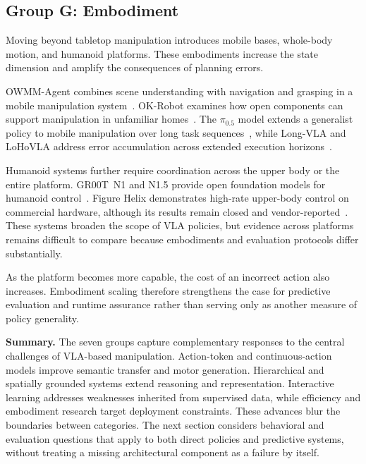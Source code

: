 \documentclass{ieeeaccess}
\begin{document}
\subsection{Group G: Embodiment}
\label{sec:groupG}

Moving beyond tabletop manipulation introduces mobile bases, whole-body motion, and humanoid platforms. These embodiments increase the state dimension and amplify the consequences of planning errors.

OWMM-Agent combines scene understanding with navigation and grasping in a mobile manipulation system~\cite{owmmagent}. OK-Robot examines how open components can support manipulation in unfamiliar homes~\cite{okrobot}. The $\pi_{0.5}$ model extends a generalist policy to mobile manipulation over long task sequences~\cite{pi05}, while Long-VLA and LoHoVLA address error accumulation across extended execution horizons~\cite{longvla,lohovla}.

Humanoid systems further require coordination across the upper body or the entire platform. GR00T~N1 and N1.5 provide open foundation models for humanoid control~\cite{groot,grootn15}. Figure Helix demonstrates high-rate upper-body control on commercial hardware, although its results remain closed and vendor-reported~\cite{helix}. These systems broaden the scope of VLA policies, but evidence across platforms remains difficult to compare because embodiments and evaluation protocols differ substantially.

As the platform becomes more capable, the cost of an incorrect action also increases. Embodiment scaling therefore strengthens the case for predictive evaluation and runtime assurance rather than serving only as another measure of policy generality.

\medskip
\noindent\textbf{Summary.}
The seven groups capture complementary responses to the central challenges of VLA-based manipulation. Action-token and continuous-action models improve semantic transfer and motor generation. Hierarchical and spatially grounded systems extend reasoning and representation. Interactive learning addresses weaknesses inherited from supervised data, while efficiency and embodiment research target deployment constraints. \textcolor[RGB]{104,48,148}{These advances blur the boundaries between categories. The next section considers behavioral and evaluation questions that apply to both direct policies and predictive systems, without treating a missing architectural component as a failure by itself.}
\end{document}
